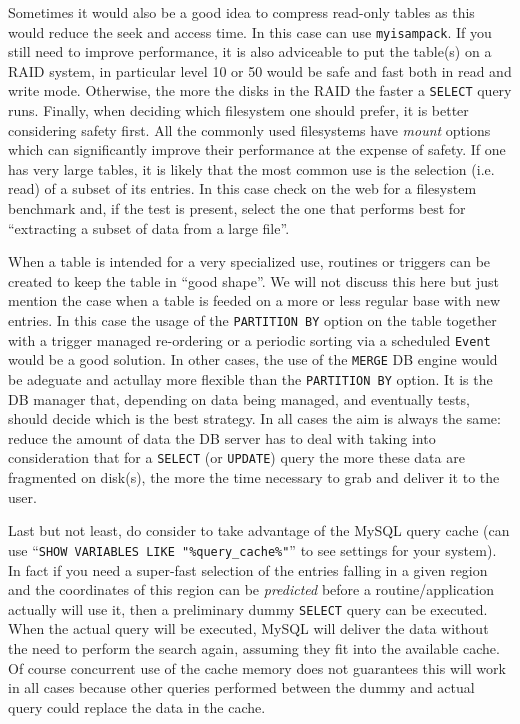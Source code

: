 \documentclass[10pt,titlepage]{article}
\begin{document}
Sometimes it would also be a good idea to compress read-only tables
as this would reduce the seek and access time. In this case can use
\verb|myisampack|.
If you still need to improve performance, it is also adviceable to put the
table(s) on a RAID system, in particular level 10 or 50 would be safe and fast
both in read and write mode. Otherwise, the more the disks in the RAID
the faster a \verb|SELECT| query runs. Finally, when deciding which
filesystem one should prefer, it is better considering safety first.
All the commonly used filesystems have \textit{mount} options which can
significantly improve their performance at the expense of safety.
If one has very large tables, it is likely that the most common use is
the selection (i.e. read) of a subset of its entries. In this case
check on the web for a filesystem benchmark and, if the test is
present, select the one that performs best for ``extracting a subset of
data from a large file''.

When a table is intended for a very specialized use, routines or triggers
can be created to keep the table in ``good shape''.
We will not discuss this here but just mention the case when a table
is feeded on a more or less regular base with new entries. In this case
the usage of the \verb|PARTITION BY| option on the table together with
a trigger managed re-ordering or a periodic sorting via a scheduled
\verb|Event| would be a good solution. In other cases, the use of the
\verb|MERGE| DB engine would be adeguate and actullay more flexible than
the \verb|PARTITION BY| option. It is the DB manager that, depending on data
being managed, and eventually tests, should decide which is the best strategy.
In all cases the aim is always the same: reduce the amount of data the
DB server has to deal with taking into consideration that for a \verb|SELECT|
(or \verb|UPDATE|) query the more these data are fragmented on disk(s),
the more the time necessary to grab and deliver it to the user. 

Last but not least, do consider to take advantage of the MySQL query cache
(can use ``\texttt{SHOW VARIABLES LIKE "\%query\_cache\%"}'' to see settings for
your system).
In fact if you need a super-fast selection of the entries falling in a
given region and the coordinates of this region can be
\emph{predicted} before a routine/application actually will use it,
then a preliminary dummy \verb|SELECT| query can be executed.
When the actual query will be executed, MySQL will deliver the data without
the need to perform the search again, assuming they fit into the
available cache. Of course concurrent use of the cache memory does not
guarantees this will work in all cases because other queries performed between
the dummy and actual query could replace the data in the cache.
\end{document}
